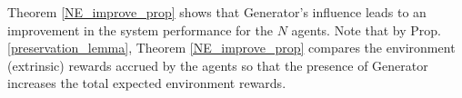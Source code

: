 \documentclass{article}
\newtheorem{definition}{Definition}
\begin{document}
Theorem \ref{NE_improve_prop} shows that {\selectfont Generator}'s influence leads to an improvement in the system performance for the $N$ agents. Note that by Prop. \ref{preservation_lemma}, Theorem \ref{NE_improve_prop} compares the environment (extrinsic) rewards accrued by the agents so that the presence of {\selectfont Generator} increases the total expected environment rewards.
% 
% 
% 
% 
% 
% 
% 
% 
\end{document}

